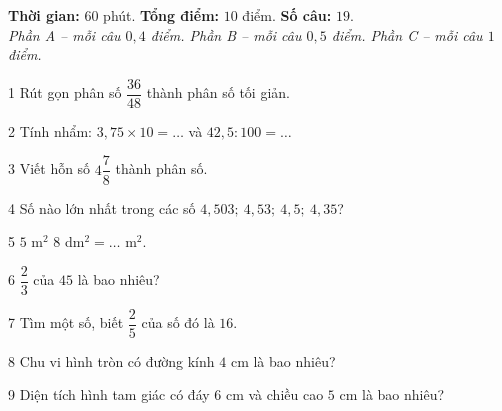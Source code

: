 \begin{knowbox}
\textbf{Thời gian:} $60$ phút. \quad \textbf{Tổng điểm:} $10$ điểm. \quad \textbf{Số câu:} $19$.\\[2pt]\emph{Phần A -- mỗi câu $0{,}4$ điểm. \quad Phần B -- mỗi câu $0{,}5$ điểm. \quad Phần C -- mỗi câu $1$ điểm.}
\end{knowbox}
\gap
{}
\begin{probbox}{1}{\relax}
Rút gọn phân số $\dfrac{36}{48}$ thành phân số tối giản.
\end{probbox}
\gap
\begin{probbox}{2}{\relax}
Tính nhẩm: $3{,}75\times10=\ldots$ \quad và \quad $42{,}5:100=\ldots$
\end{probbox}
\gap
\begin{probbox}{3}{\relax}
Viết hỗn số $4\dfrac78$ thành phân số.
\end{probbox}
\gap
\begin{probbox}{4}{\relax}
Số nào lớn nhất trong các số $4{,}503;\ 4{,}53;\ 4{,}5;\ 4{,}35$?
\end{probbox}
\gap
\begin{probbox}{5}{\relax}
$5$ m$^2$ $8$ dm$^2=\ldots$ m$^2$.
\end{probbox}
\gap
\begin{probbox}{6}{\relax}
$\dfrac23$ của $45$ là bao nhiêu?
\end{probbox}
\gap
\begin{probbox}{7}{\relax}
Tìm một số, biết $\dfrac25$ của số đó là $16$.
\end{probbox}
\gap
\begin{probbox}{8}{\relax}
Chu vi hình tròn có đường kính $4$ cm là bao nhiêu?
\end{probbox}
\gap
\begin{probbox}{9}{\relax}
Diện tích hình tam giác có đáy $6$ cm và chiều cao $5$ cm là bao nhiêu?
\end{probbox}

